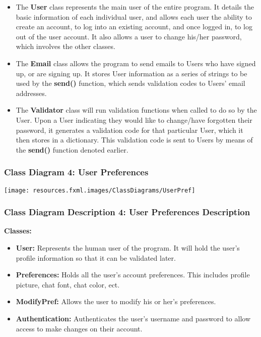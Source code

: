 \documentclass[twoside,letterpaper]{article}
\begin{document}
{\begin{itemize}
	\item The \textbf{User} class represents the main user of the entire program. It details the basic information of each individual user, and allows each user the ability to create an account, to log into an existing account, and once logged in, to log out of the user account. It also allows a user to change his/her password, which involves the other classes.
	\item The \textbf{Email} class allows the program to send emails to Users who have signed up, or are signing up. It stores User information as a series of strings to be used by the \textbf{send()} function, which sends validation codes to Users' email addresses.
	\item The \textbf{Validator} class will run validation functions when called to do so by the User. Upon a User indicating they would like to change/have forgotten their password, it generates a validation code for that particular User, which it then stores in a dictionary. This validation code is sent to Users by means of the \textbf{send()} function denoted earlier.
\end{itemize}

\newpage

\subsubsection[Class Diagram 4: User Preferences]{\rmfamily\bfseries\color{black}
	Class Diagram 4: User Preferences}
\hypertarget{RefHeading22059017292}{}
\bigskip

\texttt{[image: resources.fxml.images/ClassDiagrams/UserPref]}

\newpage

\subsubsection[Class Diagram Description 4: User Preferences Description]{\rmfamily\bfseries\color{black}
	Class Diagram Description 4: User Preferences Description}
\hypertarget{RefHeading22059017292}{}

\textbf{Classes:}
\begin{itemize}

       \item \textbf{User:} Represents the human user of the program. It will hold the user's profile information so that it can be validated later.
       \item \textbf{Preferences:} Holds all the user's account preferences. This includes profile picture, chat font, chat color, ect.
       \item \textbf{ModifyPref:} Allows the user to modify his or her's preferences.
       \item \textbf{Authentication:} Authenticates the user's username and password to allow access to make changes on their account.
\end{itemize}

}
\end{document}
